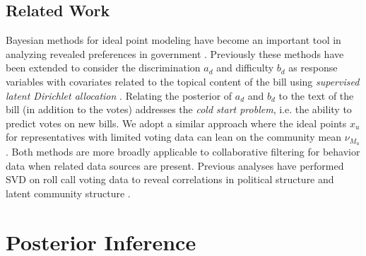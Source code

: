 \documentclass{article}
\begin{document}
\subsection{Related Work}

Bayesian methods for ideal point modeling have become an important tool in analyzing revealed preferences in government \cite{Clinton2004}. Previously these methods have been extended to consider the discrimination $a_d$ and difficulty $b_d$ as response variables with covariates related to the topical content of the bill using {\sl supervised latent Dirichlet allocation} \cite{Gerrish2011}. Relating the posterior of $a_d$ and $b_d$ to the text of the bill (in addition to the votes) addresses the {\sl cold start problem}, i.e. the ability to predict votes on new bills. We adopt a similar approach where the ideal points $x_u$ for representatives with limited voting data can lean on the community mean $\nu_{M_u}$. Both methods are more broadly applicable to collaborative filtering for behavior data when related data sources are present. Previous analyses have performed SVD on roll call voting data to reveal correlations in political structure and latent community structure \cite{Porter2007}.

\section{Posterior Inference}
\label{inference}
\end{document}
